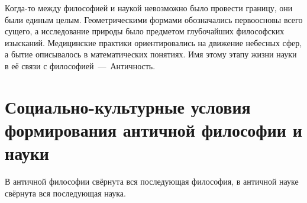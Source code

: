 




Когда-то между философией и наукой невозможно было провести границу, они были единым целым. Геометрическими формами обозначались первоосновы всего сущего, а исследование природы было предметом глубочайших философских изысканий. Медицинские практики ориентировались на движение небесных сфер, а бытие описывалось в математических понятиях.  Имя этому этапу жизни науки в её связи с философией~---~Античность. 

\section{Социально-культурные условия формирования античной философии и науки}


В античной философии свёрнута вся последующая философия, в античной науке свёрнута вся последующая наука. 


